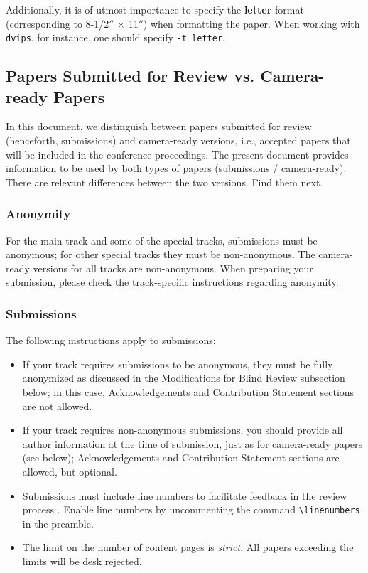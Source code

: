 \documentclass{article}
\begin{document}
Additionally, it is of utmost importance to specify the {\bf
        letter} format (corresponding to 8-1/2$''$ $\times$ 11$''$) when
formatting the paper. When working with {\tt dvips}, for instance, one
should specify {\tt -t letter}.

\subsection{Papers Submitted for Review vs. Camera-ready Papers}
In this document, we distinguish between papers submitted for review (henceforth, submissions) and camera-ready versions, i.e., accepted papers that will be included in the conference proceedings. The present document provides information to be used by both types of papers (submissions / camera-ready). There are relevant differences between the two versions. Find them next.

\subsubsection{Anonymity}
For the main track and some of the special tracks, submissions must be anonymous; for other special tracks they must be non-anonymous. The camera-ready versions for all tracks are non-anonymous. When preparing your submission, please check the track-specific instructions regarding anonymity.

\subsubsection{Submissions}
The following instructions apply to submissions:
\begin{itemize}
\item If your track requires submissions to be anonymous, they must be fully anonymized as discussed in the Modifications for Blind Review subsection below; in this case, Acknowledgements and Contribution Statement sections are not allowed.

\item If your track requires non-anonymous submissions, you should provide all author information at the time of submission, just as for camera-ready papers (see below); Acknowledgements and Contribution Statement sections are allowed, but optional.

\item Submissions must include line numbers to facilitate feedback in the review process . Enable line numbers by uncommenting the command {\tt \textbackslash{}linenumbers} in the preamble.

\item The limit on the number of  content pages is \emph{strict}. All papers exceeding the limits will be desk rejected.
\end{itemize}
\end{document}
